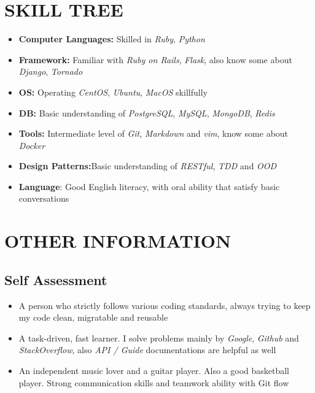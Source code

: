 \documentclass[12pt, a4paper,sans]{moderncv}       %
\begin{document}
\section{SKILL TREE}
    \begin{itemize}
        \item{\textbf{Computer Languages:} {Skilled in \textit{Ruby}, \textit{Python}}}%
        \item{\textbf{Framework:} {Familiar with \textit{Ruby on Rails}, \textit{Flask}, also know some about \textit{Django}, \textit{Tornado}}}%
        \item{\textbf{OS:} {Operating \textit{CentOS}, \textit{Ubuntu}, \textit{MacOS} skillfully}}%
        \item{\textbf{DB:} {Basic understanding of \textit{PostgreSQL}, \textit{MySQL}, \textit{MongoDB}, \textit{Redis}}}%
        \item{\textbf{Tools:} {Intermediate level of \textit{Git}, \textit{Markdown} and \textit{vim}, know some about \textit{Docker}}}%
        \item{\textbf{Design Patterns:}{Basic understanding of \textit{RESTful}, \textit{TDD} and \textit{OOD}}}%
        \item{\textbf{Language}: {Good English literacy, with oral ability that satisfy basic conversations} }
    \end{itemize}

\vspace{0pt}
\section{OTHER INFORMATION}

\subsection{Self Assessment}

    \begin{itemize}
        \item{\medium A person who strictly follows various coding standards, always trying to keep my code clean, migratable and reusable}
        \item{\medium A task-driven, fast learner. I solve problems mainly by \textit{Google}, \textit{Github} and \textit{StackOverflow}, also \textit{API / Guide} documentations are helpful as well}
        \item{\medium An independent music lover and a guitar player. Also a good basketball player. Strong communication skills and teamwork ability with Git flow}
    \end{itemize}
\end{document}
